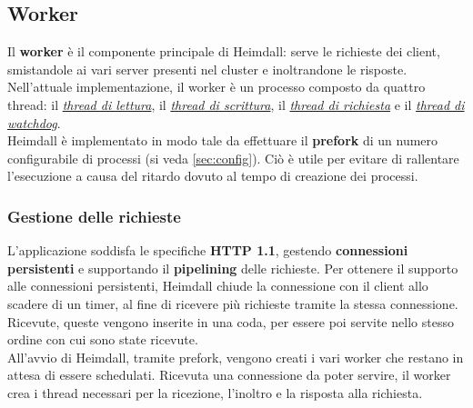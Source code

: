 \documentclass[italian]{tktltiki2}
\begin{document}
\subsection{Worker}
\label{sec:worker}
Il \textbf{worker} è il componente principale di Heimdall: serve le richieste dei client, smistandole ai vari server presenti nel cluster e inoltrandone le risposte.
\\
Nell'attuale implementazione, il worker è un processo composto da quattro thread: il \hyperref[sec:reader]{\emph{thread di lettura}}, il \hyperref[sec:writer]{\emph{thread di scrittura}}, il \hyperref[sec:request]{\emph{thread di richiesta}} e il \hyperref[sec:watchdog]{\emph{thread di watchdog}}.
\\
Heimdall è implementato in modo tale da effettuare il \textbf{prefork} di un numero configurabile di processi (si veda \ref{sec:config}). Ciò è utile per evitare di rallentare l'esecuzione a causa del ritardo dovuto al tempo di creazione dei processi.
\subsubsection{Gestione delle richieste}
\label{sec:requests_management}
L'applicazione soddisfa le specifiche \textbf{HTTP 1.1}\cite{http_1.1}, gestendo \textbf{connessioni persistenti}\cite{persistent_connections} e supportando il \textbf{pipelining}\cite{pipeling} delle richieste. Per ottenere il supporto alle connessioni persistenti, Heimdall chiude la connessione con il client allo scadere di un timer, al fine di ricevere più richieste tramite la stessa connessione. Ricevute, queste vengono inserite in una coda, per essere poi servite nello stesso ordine con cui sono state ricevute.
\\
All'avvio di Heimdall, tramite prefork, vengono creati i vari worker che restano in attesa di essere schedulati. Ricevuta una connessione da poter servire, il worker crea i thread necessari per la ricezione, l'inoltro e la risposta alla richiesta.
\end{document}
